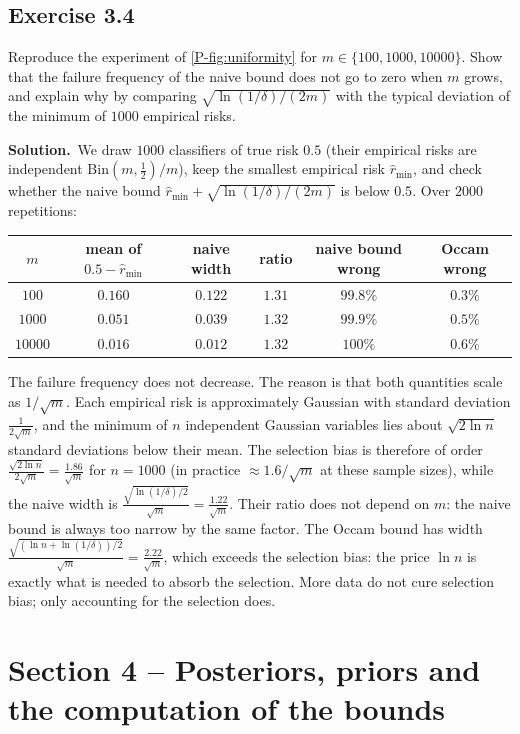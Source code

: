 \documentclass[11pt]{article}
\newcommand{\statement}[1]{\begin{tcolorbox}[enhanced,breakable,colback=black!3,colframe=black!25,boxrule=0.4pt,sharp corners,fontupper=\itshape\small]#1\end{tcolorbox}}
\newcommand{\exo}[1]{\Needspace{6\baselineskip}\subsection*{Exercise #1}\addcontentsline{toc}{subsection}{Exercise #1}}
\newcommand{\sol}{\noindent\textbf{Solution.}\ }
\begin{document}
\exo{3.4}
\statement{Reproduce the experiment of \cref{P-fig:uniformity} for $m\in\{100,1000,10000\}$. Show that the failure frequency
of the naive bound does not go to zero when $m$ grows, and explain why by comparing $\sqrt{\ln(1/\delta)/(2m)}$ with
the typical deviation of the minimum of $1000$ empirical risks.}

\sol We draw $1000$ classifiers of true risk $0.5$ (their empirical risks are independent $\mathrm{Bin}(m,\frac12)/m$),
keep the smallest empirical risk $\hat r_{\min}$, and check whether the naive bound $\hat r_{\min}+\sqrt{\ln(1/\delta)/(2m)}$ is
below $0.5$. Over $2000$ repetitions:
\begin{center}\small
\begin{tabular}{cccccc}
\toprule
$m$ & mean of $0.5-\hat r_{\min}$ & naive width & ratio & naive bound wrong & Occam wrong \\
\midrule
$100$ & $0.160$ & $0.122$ & $1.31$ & $99.8\%$ & $0.3\%$ \\
$1000$ & $0.051$ & $0.039$ & $1.32$ & $99.9\%$ & $0.5\%$ \\
$10000$ & $0.016$ & $0.012$ & $1.32$ & $100\%$ & $0.6\%$ \\
\bottomrule
\end{tabular}
\end{center}
The failure frequency does not decrease. The reason is that both quantities scale as $1/\sqrt m$. Each empirical risk
is approximately Gaussian with standard deviation $\frac{1}{2\sqrt m}$, and the minimum of $n$ independent Gaussian
variables lies about $\sqrt{2\ln n}$ standard deviations below their mean. The selection bias is therefore of order
$\frac{\sqrt{2\ln n}}{2\sqrt m}=\frac{1.86}{\sqrt m}$ for $n=1000$ (in practice $\approx1.6/\sqrt m$ at these sample sizes), while
the naive width is $\frac{\sqrt{\ln(1/\delta)/2}}{\sqrt m}=\frac{1.22}{\sqrt m}$. Their ratio does not depend on $m$: the naive bound
is always too narrow by the same factor. The Occam bound has width $\frac{\sqrt{(\ln n+\ln(1/\delta))/2}}{\sqrt m}=\frac{2.22}{\sqrt m}$,
which exceeds the selection bias: the price $\ln n$ is exactly what is needed to absorb the selection. More data do not
cure selection bias; only accounting for the selection does.

\section*{Section 4 -- Posteriors, priors and the computation of the bounds}
\end{document}
